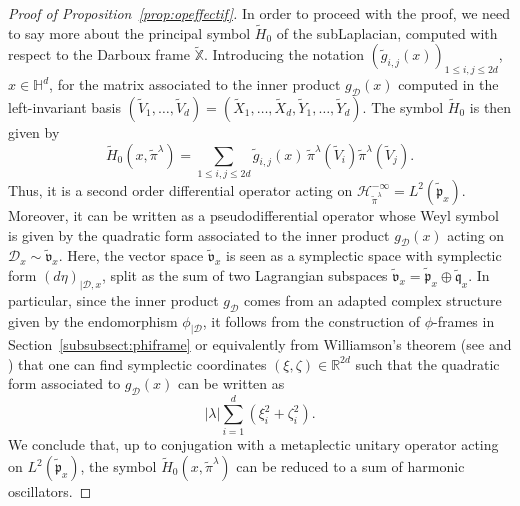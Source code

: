 \documentclass[12pt,a4paper]{amsart}
\theoremstyle{plain}
\theoremstyle{definition}
\theoremstyle{remark}
\numberwithin{equation}{section}
\theoremstyle{definition}
\def\R{{\mathbb R}}%
\def \cD{\mathcal{D}}
\def \bX{\mathbb{X}}
\def \Heis{\mathbb{H}}
\def \cH{\mathcal{H}}
\numberwithin{equation}{section}
\begin{document}
\begin{proof}[Proof of Proposition~\ref{prop:opeffectif}]
    In order to proceed with the proof, we need to say more about the principal symbol $\tilde{H}_0$ of the subLaplacian, computed with respect to the Darboux frame $\tilde{\bX}$. Introducing the notation $(\tilde{g}_{i,j}(x))_{1\leq i,j\leq 2d}$, $x\in\Heis^d$, for the matrix associated to the inner product $g_{\cD}(x)$ computed in the left-invariant basis $(\tilde{V}_1,\dots,\tilde{V}_d) = (\tilde{X}_1,\dots,\tilde{X}_d,\tilde{Y}_1,\dots,\tilde{Y}_d)$. The symbol $\tilde{H}_0$ is then given by
    \begin{equation*}
        \tilde{H}_0(x,\tilde{\pi}^\lambda) = \sum_{1\leq i,j\leq 2d} \tilde{g}_{i,j}(x)\,\tilde{\pi}^\lambda(\tilde{V}_i)\tilde{\pi}^\lambda(\tilde{V}_j).
    \end{equation*}
    Thus, it is a second order differential operator acting on $\cH_{\tilde{\pi}^\lambda}^{-\infty} = L^2(\tilde{\mathfrak{p}}_x)$. Moreover, it can be written as a pseudodifferential operator whose Weyl symbol is given by the quadratic form associated to the inner product $g_{\cD}(x)$ acting on $\cD_x \sim \tilde{\mathfrak{v}}_x$. Here, the vector space $\tilde{\mathfrak{v}}_x$ is seen as a symplectic space with symplectic form $(d\eta)_{|\cD,x}$, split as the sum of two Lagrangian subspaces $\tilde{\mathfrak{v}}_x = \tilde{\mathfrak{p}}_x\oplus\tilde{\mathfrak{q}}_x$. In particular, since the inner product $g_\cD$ comes from an adapted complex structure given by the endomorphism $\phi_{|\cD}$, it follows from the construction of $\phi$-frames in Section~\ref{subsubsect:phiframe} or equivalently from Williamson's theorem (see \cite[Section 10]{Ep} and \cite[Proposition 32]{MAG}) that one can find symplectic coordinates $(\xi,\zeta)\in\R^{2d}$ such that the quadratic form associated to $g_\cD(x)$ can be written as
    \begin{equation*}
        |\lambda|\sum_{i=1}^d  (\xi_i^2 + \zeta_i^2).
    \end{equation*}
    We conclude that, up to conjugation with a metaplectic unitary operator acting on $L^2(\tilde{\mathfrak{p}}_x)$, the symbol $\tilde{H}_0(x,\tilde{\pi}^\lambda)$ can be reduced to a sum of harmonic oscillators.


\end{proof}
\end{document}
